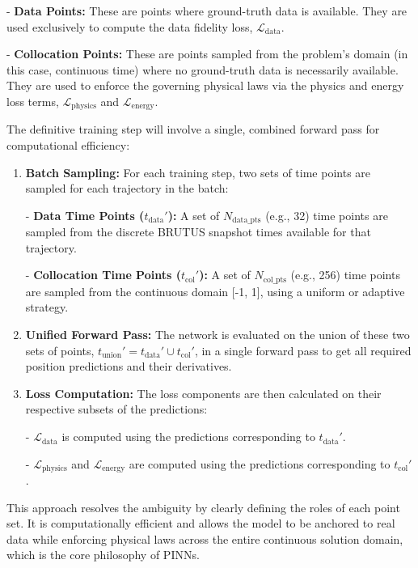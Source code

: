 - \textbf{Data Points:} These are points where ground-truth data is available. They are used exclusively to compute the data fidelity loss, $\mathcal{L}_{\text{data}}$.

- \textbf{Collocation Points:} These are points sampled from the problem's domain (in this case, continuous time) where no ground-truth data is necessarily available. They are used to enforce the governing physical laws via the physics and energy loss terms, $\mathcal{L}_{\text{physics}}$ and $\mathcal{L}_{\text{energy}}$.

The definitive training step will involve a single, combined forward pass for computational efficiency:
\begin{enumerate}
    \item \textbf{Batch Sampling:} For each training step, two sets of time points are sampled for each trajectory in the batch:


- \textbf{Data Time Points ($t_{\text{data}}'$):} A set of $N_{\text{data\_pts}}$ (e.g., 32) time points are sampled from the discrete BRUTUS snapshot times available for that trajectory.

- \textbf{Collocation Time Points ($t_{\text{col}}'$):} A set of $N_{\text{col\_pts}}$ (e.g., 256) time points are sampled from the continuous domain [-1, 1], using a uniform or adaptive strategy.

    \item \textbf{Unified Forward Pass:} The network is evaluated on the union of these two sets of points, $t_{\text{union}}' = t_{\text{data}}' \cup t_{\text{col}}'$, in a single forward pass to get all required position predictions and their derivatives.
    \item \textbf{Loss Computation:} The loss components are then calculated on their respective subsets of the predictions:


- $\mathcal{L}_{\text{data}}$ is computed using the predictions corresponding to $t_{\text{data}}'$.

- $\mathcal{L}_{\text{physics}}$ and $\mathcal{L}_{\text{energy}}$ are computed using the predictions corresponding to $t_{\text{col}}'$.

\end{enumerate}
This approach resolves the ambiguity by clearly defining the roles of each point set. It is computationally efficient and allows the model to be anchored to real data while enforcing physical laws across the entire continuous solution domain, which is the core philosophy of PINNs.

